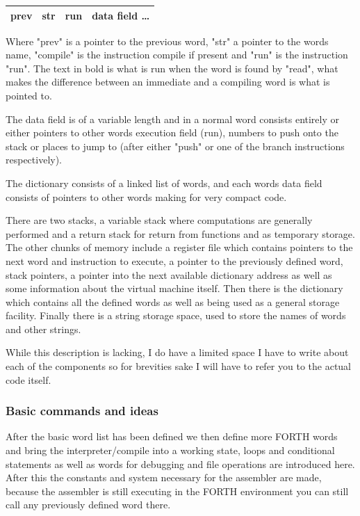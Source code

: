 \documentclass	[a4paper, 10pt]	{article}
\begin{document}
      \begin{center}
        \begin{tabular}{l | c | c | r }
          \hline
          prev & str & \textbf{run} & data field \ldots \\
          \hline
        \end{tabular}
      \end{center}

      Where "prev" is a pointer to the previous word, "str" a pointer to the words
      name, "compile" is the instruction compile if present and "run" is the instruction
      "run". The text in bold is what is run when the word is found by "read", what makes
      the difference between an immediate and a compiling word is what is pointed to.

      The data field is of a variable length and in a normal word consists entirely or
      either pointers to other words execution field (run), numbers
      to push onto the stack or places to jump to (after either "push" or one of the
      branch instructions respectively).

      The dictionary consists of a linked list of words, and each words data field
      consists of pointers to other words making for very compact code.

      There are two stacks, a variable stack where computations are generally performed
      and a return stack for return from functions and as temporary storage. The other
      chunks of memory include a register file which contains pointers to the next
      word and instruction to execute, a pointer to the previously defined word, stack
      pointers, a pointer into the next available dictionary address as well as some
      information about the virtual machine itself. Then there is the dictionary which
      contains all the defined words as well as being used as a general storage facility.
      Finally there is a string storage space, used to store the names of words and
      other strings.

      While this description is lacking, I do have a limited space I have to write about
      each of the components so for brevities sake I will have to refer you to the
      actual code itself.
       
      \subsubsection{Basic commands and ideas}

      After the basic word list has been defined we then define more FORTH words and
      bring the interpreter/compile into a working state, loops and conditional
      statements as well as words for debugging and file operations are introduced
      here. After this the constants and system necessary for the assembler are made,
      because the assembler is still executing in the FORTH environment you can still
      call any previously defined word there.
\end{document}
